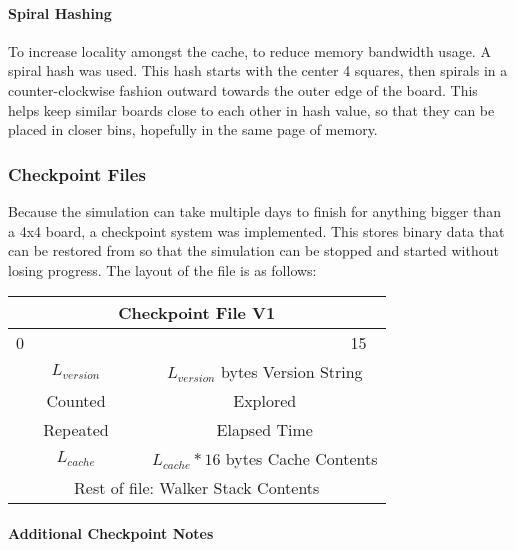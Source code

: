 \documentclass{article}
\begin{document}
\paragraph{Spiral Hashing}

To increase locality amongst the cache, to reduce memory bandwidth usage. A spiral hash was used. This hash starts with the center 4 squares, then spirals in a counter-clockwise fashion outward towards the outer edge of the board. This helps keep similar boards close to each other in hash value, so that they can be placed in closer bins, hopefully in the same page of memory.

\newpage

\subsubsection{Checkpoint Files}

Because the simulation can take multiple days to finish for anything bigger than a 4x4 board, a checkpoint system was implemented. This stores binary data that can be restored from so that the simulation can be stopped and started without losing progress. The layout of the file is as follows:

\vspace{0.5cm}

\begin{tabular}{|c|c|c|c|c|c|c|c|c|c|c|c|c|c|c|c|}
	\hline
	\multicolumn{16}{|c|}{Checkpoint File V1} \\
	\hline
	0 &&&&&&&&&&&&&&& 15 \\
	\hline
	\multicolumn{8}{|c|}{$L_{version}$} & \multicolumn{8}{|c|}{ $L_{version}$ bytes Version String} \\
	\hline
	\multicolumn{8}{|c|}{Counted} & \multicolumn{8}{|c|}{Explored} \\
	\hline
	\multicolumn{8}{|c|}{Repeated} & \multicolumn{8}{|c|}{Elapsed Time} \\
	\hline
	\multicolumn{8}{|c|}{$L_{cache}$} & \multicolumn{8}{|c|}{$L_{cache}*16$ bytes Cache Contents} \\
	\hline
	\multicolumn{16}{|c|}{Rest of file: Walker Stack Contents} \\
	\hline
\end{tabular}

\paragraph{Additional Checkpoint Notes}
\end{document}
